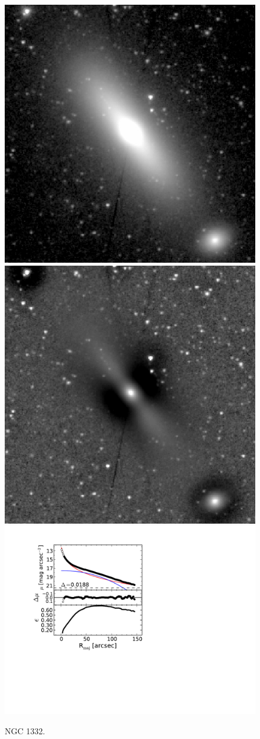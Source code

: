 \documentclass[useAMS,usenatbib,article]{mn2e}
\begin{document}
\begin{figure}
\begin{center}
\includegraphics[width=0.49\columnwidth]{images/n1332_image}
\includegraphics[width=0.49\columnwidth]{images/n1332_unsharp} \\
\includegraphics[width=1.03\columnwidth]{images/n1332_decomposition.pdf}
\caption{NGC 1332.
}
\end{center}
\end{figure}
\end{document}
